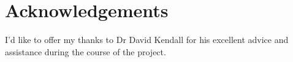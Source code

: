\chapter{Acknowledgements}
I'd like to offer my thanks to Dr David Kendall for his excellent advice and assistance during the course of the project.
